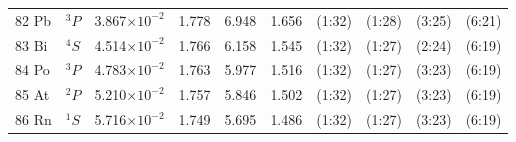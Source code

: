 \begin{longtable}{l l r r r r r r r r}
82 Pb 	&  	$^{3}P$   	&   	3.867$\times10^{-2}$   	&   	1.778   	&   	6.948   	&   	1.656   	&   	(1:32)   	&   	(1:28)   	&   	(3:25)   	&   	(6:21) 	\\   	
83 Bi 	&  	$^{4}S$   	&   	4.514$\times10^{-2}$   	&   	1.766   	&   	6.158   	&   	1.545   	&   	(1:32)   	&   	(1:27)   	&   	(2:24)   	&   	(6:19) 	\\   	
84 Po 	& 	$^{3}P$   	&   	4.783$\times10^{-2}$ 	& 	1.763 	& 	5.977 	& 	1.516 	& 	(1:32) 	& 	(1:27) 	& 	(3:23) 	& 	(6:19) 	\\   	
85 At 	& 	$^{2}P$ 	&   	5.210$\times10^{-2}$ 	& 	1.757 	& 	5.846 	& 	1.502 	& 	(1:32) 	& 	(1:27) 	& 	(3:23) 	& 	(6:19) 	\\
86 Rn 	& 	$^{1}S$ 	&   	5.716$\times10^{-2}$ 	& 	1.749 	& 	5.695 	& 	1.486 	& 	(1:32) 	& 	(1:27) 	& 	(3:23) 	& 	(6:19) 	\\
\bottomrule  	
\end{longtable}  	
  	
